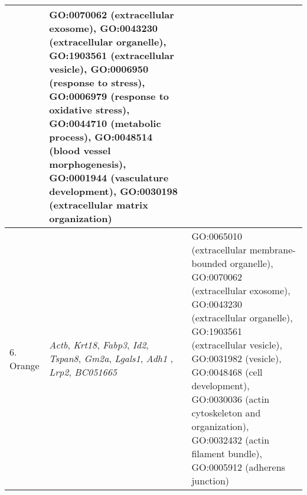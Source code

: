 \begin{table}[!hp]
\begin{adjustwidth}{-.50in}{0in}
\begin{tabular}{|p{1.0in}|p{1.5in}|p{4.3in}|}
{& GO:0070062 (extracellular exosome), GO:0043230 (extracellular organelle), GO:1903561 (extracellular vesicle), GO:0006950 (response to stress), GO:0006979 (response to oxidative stress), GO:0044710 (metabolic process), GO:0048514 (blood vessel morphogenesis), GO:0001944 (vasculature development), GO:0030198 (extracellular matrix organization) \\ 
\hline
6. Orange & \textit{Actb}, \textit{Krt18}, \textit{Fabp3}, \textit{Id2}, \textit{Tspan8}, \textit{Gm2a}, \textit{Lgals1}, \textit{Adh1}
, \textit{Lrp2}, \textit{BC051665}
& GO:0065010 (extracellular membrane-bounded organelle), GO:0070062 (extracellular exosome),  GO:0043230 (extracellular organelle), GO:1903561 (extracellular vesicle), GO:0031982 (vesicle), GO:0048468 (cell development), GO:0030036 (actin cytoskeleton and organization), GO:0032432 (actin filament bundle),  GO:0005912 (adherens junction)\\ 
\hline
\end{tabular} \label{tab:tab3}
\end{adjustwidth}
 \end{table}



